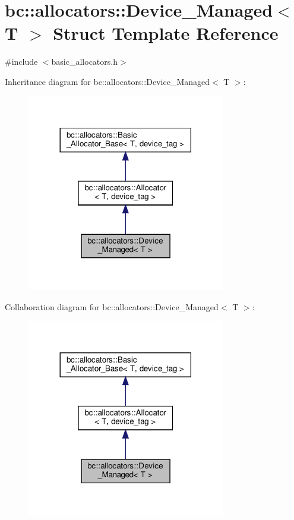 \hypertarget{structbc_1_1allocators_1_1Device__Managed}{}\section{bc\+:\+:allocators\+:\+:Device\+\_\+\+Managed$<$ T $>$ Struct Template Reference}
\label{structbc_1_1allocators_1_1Device__Managed}


{\ttfamily \#include $<$basic\+\_\+allocators.\+h$>$}



Inheritance diagram for bc\+:\+:allocators\+:\+:Device\+\_\+\+Managed$<$ T $>$\+:\nopagebreak
\begin{figure}[H]
\begin{center}
\leavevmode
\includegraphics[width=245pt]{structbc_1_1allocators_1_1Device__Managed__inherit__graph}
\end{center}
\end{figure}


Collaboration diagram for bc\+:\+:allocators\+:\+:Device\+\_\+\+Managed$<$ T $>$\+:\nopagebreak
\begin{figure}[H]
\begin{center}
\leavevmode
\includegraphics[width=245pt]{structbc_1_1allocators_1_1Device__Managed__coll__graph}
\end{center}
\end{figure}
